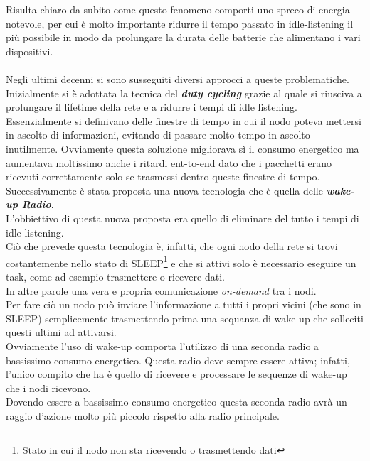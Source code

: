 Risulta chiaro da subito come questo fenomeno comporti uno spreco di energia notevole, per cui è molto importante ridurre il tempo passato in idle-listening il più possibile in modo da prolungare la durata delle batterie che alimentano i vari dispositivi.\\
\\
Negli ultimi decenni si sono susseguiti diversi approcci a queste problematiche.\\

Inizialmente si è adottata la tecnica del \textbf{\textit{duty cycling}} grazie al quale si riusciva a prolungare il lifetime della rete e a ridurre i tempi di idle listening. Essenzialmente si definivano delle finestre di tempo in cui il nodo poteva mettersi in ascolto di informazioni, evitando di passare molto tempo in ascolto inutilmente. Ovviamente questa soluzione migliorava sì il consumo energetico ma aumentava moltissimo anche i ritardi ent-to-end dato che i pacchetti erano ricevuti correttamente solo se trasmessi dentro queste finestre di tempo.\\

Successivamente è stata proposta una nuova tecnologia che è quella delle \textbf{\textit{wake-up Radio}}.\\ L'obbiettivo di questa nuova proposta era quello di eliminare del tutto i tempi di idle listening.\\
Ciò che prevede questa tecnologia è, infatti, che ogni nodo della rete si trovi costantemente nello stato di SLEEP\footnote{Stato in cui il nodo non sta ricevendo o trasmettendo dati} e che si attivi solo è necessario eseguire un task, come ad esempio trasmettere o ricevere dati.\\
In altre parole una vera e propria comunicazione \textit{on-demand} tra i nodi.\\
Per fare ciò un nodo può inviare l'informazione a tutti i propri vicini (che sono in SLEEP) semplicemente trasmettendo prima una sequanza di wake-up che solleciti questi ultimi ad attivarsi.\\ Ovviamente l'uso di wake-up comporta l'utilizzo di una seconda radio a bassissimo consumo energetico. Questa radio deve sempre essere attiva; infatti, l'unico compito che ha è quello di ricevere e processare le sequenze di wake-up che i nodi ricevono.\\
Dovendo essere a bassissimo consumo energetico questa seconda radio avrà un raggio d'azione molto più piccolo rispetto alla radio principale.\\

